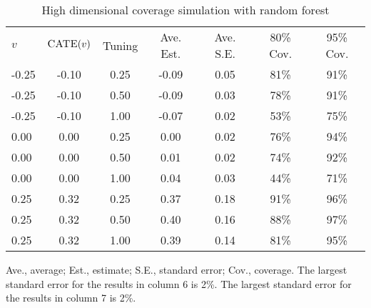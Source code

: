 \begin{table}[H]
\centering
  \begin{threeparttable}
    \caption{High dimensional coverage simulation with random forest}
     \begin{tabular}{lcccccc}
       $v$& $\textsc{CATE}(v)$ & Tuning &  Ave. Est. & Ave. S.E. &  80\% Cov. & 95\% Cov. \\[5pt]
-0.25 & -0.10 & 0.25 & -0.09 & 0.05 &  81\% & 91\% \\
-0.25 & -0.10 & 0.50 & -0.09 & 0.03  & 78\% & 91\% \\
-0.25 & -0.10 & 1.00 & -0.07 & 0.02  & 53\% & 75\% \\
0.00 & 0.00 & 0.25 & 0.00 & 0.02 &  76\% & 94\% \\
0.00 & 0.00 & 0.50 & 0.01 & 0.02  & 74\% & 92\% \\
0.00 & 0.00 & 1.00 & 0.04 & 0.03  & 44\% & 71\% \\
0.25 & 0.32 & 0.25 & 0.37 & 0.18 &  91\% & 96\% \\
0.25 & 0.32 & 0.50 & 0.40 & 0.16  & 88\% & 97\% \\
0.25 & 0.32 & 1.00 & 0.39 & 0.14  & 81\% & 95\% 
     \end{tabular}
     \label{tab:rf_high}
    \begin{tablenotes}
      \small
      \item Ave., average; Est., estimate; S.E., standard error; Cov., coverage. The largest standard error for the results in column 6 is 2\%. The largest standard error for the results in column 7 is 2\%.
    \end{tablenotes}
  \end{threeparttable}
\end{table}


